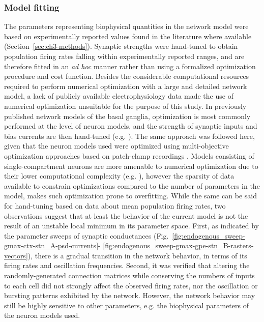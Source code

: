 \subsubsection*{Model fitting}

%
%
%
%
%
%
%
%
%

%
%
%
%
%
%
%

%
%
%
%
%
%
%
%

The parameters representing biophysical quantities in the network model were based on
experimentally reported values found in the literature where available (Section~\ref{sec:ch3-methods}). Synaptic strengths were hand-tuned to obtain population firing rates falling within experimentally
reported ranges, and are therefore fitted in an \textit{ad hoc} manner rather than using a formalized
optimization procedure and cost function. Besides the considerable computational resources
required to perform numerical optimization with a large and detailed network model, a lack of
publicly available electrophysiology data made the use of numerical optimization unsuitable
for the purpose of this study.
In previously published network models of the basal ganglia, optimization is most commonly performed
at the level of neuron models, and the strength of synaptic inputs and bias currents
are then hand-tuned (e.g. \cite{terman_activity_2002,kumar_role_2011,corbit_pallidostriatal_2016,lindahl_untangling_2016,fountas_role_2017}).
The same approach was followed here, given that the neuron models used were optimized using
multi-objective optimization approaches based on patch-clamp recordings \cite{gillies_membrane_2005,gunay_channel_2008}.
Models consisting of single-compartment neurons are more amenable to numerical
optimization due to their lower computational complexity (e.g. \cite{hahn_modeling_2010}),
however the sparsity of data available to constrain optimizations compared to the number
of parameters in the model, makes such optimization prone to overfitting.
While the same can be said for hand-tuning based on data about mean population firing rates,
two observations suggest that at least the behavior of the current model is not the
result of an unstable local minimum in its parameter space. First, as indicated by the
parameter sweeps of synaptic conductances (Fig.~\ref{fig:endogenous_sweep-gmax-ctx-stn_A-psd-currents}-
\ref{fig:endogenous_sweep-gmax-gpe-stn_B-rasters-vectors}), there is a gradual transition
in the network behavior, in terms of its firing rates and oscillation frequencies.
Second, it was verified that altering the randomly-generated connection matrices
while conserving the numbers of inputs to each cell did not strongly affect
the observed firing rates, nor the oscillation or bursting patterns exhibited by the network.
However, the network behavior may still be highly sensitive to other parameters,
e.g. the biophysical parameters of the neuron models used.

